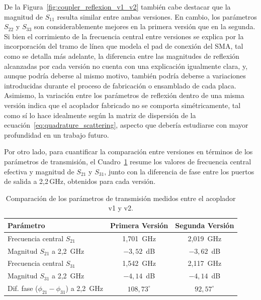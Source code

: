 De la Figura~\ref{fig:coupler_reflexion_v1_v2} también cabe destacar que la magnitud de $S_{11}$ resulta similar entre ambas versiones. En cambio, los parámetros $S_{22}$ y $S_{33}$ son considerablemente mejores en la primera versión que en la segunda. Si bien el corrimiento de la frecuencia central entre versiones se explica por la incorporación del tramo de línea que modela el pad de conexión del SMA, tal como se detalla más adelante, la diferencia entre las magnitudes de reflexión alcanzadas por cada versión no cuenta con una explicación igualmente clara, y, aunque podría deberse al mismo motivo, también podría deberse a variaciones introducidas durante el proceso de fabricación o ensamblado de cada placa. Asimismo, la variación entre los parámetros de reflexión dentro de una misma versión indica que el acoplador fabricado no se comporta simétricamente, tal como sí lo hace idealmente según la matriz de dispersión de la ecuación~\eqref{eq:quadrature_scattering}, aspecto que debería estudiarse con mayor profundidad en un trabajo futuro.

Por otro lado, para cuantificar la comparación entre versiones en términos de los parámetros de transmisión, el Cuadro~\ref{tab:coupler_v1_v2} resume los valores de frecuencia central efectiva y magnitud de $S_{21}$ y $S_{31}$, junto con la diferencia de fase entre los puertos de salida a 2,2\,GHz, obtenidos para cada versión.

\begin{table}[H]
    \centering
    \caption{Comparación de los parámetros de transmisión medidos entre el acoplador v1 y v2.}
    \label{tab:coupler_v1_v2}
    \begin{tabular}{lcc}
        \hline\hline
        \textbf{Parámetro} & \textbf{Primera Versión} & \textbf{Segunda Versión} \\
        \hline
        Frecuencia central $S_{21}$                           & 1,701~GHz      & 2,019~GHz       \\
        Magnitud $S_{21}$ a 2,2~GHz                  & $-3,52$~dB     & $-3,62$~dB       \\
        Frecuencia central $S_{31}$                           & 1,542~GHz      & 2,117~GHz       \\
        Magnitud $S_{31}$ a 2,2~GHz                  & $-4,14$~dB     & $-4,14$~dB      \\
        Dif. fase ($\phi_{21}-\phi_{31}$) a 2,2~GHz  & $108,73^\circ$ & $92,57^\circ$   \\
        \hline\hline
    \end{tabular}
\end{table}

